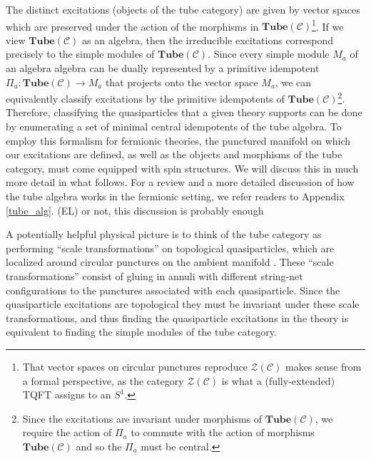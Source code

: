 \documentclass[12pt,a4paper]{article}
\newcounter{arrow}
\newcommand{\ra}{\rightarrow}
\newcommand{\mcz}{\mathcal{Z}}
\newcommand{\mcc}{\mathcal{C}}
\newcommand{\tube}{\textbf{Tube}}
\newcommand{\ethan}[1]{{\color{amethyst}\footnotesize{(EL) #1}}}
\begin{document}
The distinct excitations (objects of the tube category) are given by vector spaces which are preserved under the action of the morphisms in $\tube(\mcc)$\footnote{That vector spaces on circular punctures reproduce $\mcz(\mcc)$ makes sense from a formal perspective, as the category $\mcz(\mcc)$ is what a (fully-extended) TQFT assigns to an $S^1$.}. 
If we view $\tube(\mcc)$ as an algebra, then the irreducible excitations correspond precisely to the simple modules of $\tube(\mcc)$.
Since every simple module $M_a$ of an algebra algebra can be dually represented by a primitive idempotent $\Pi_a : \tube(\mcc) \ra M_a$ that projects onto the vector space $M_a$, we can equivalently classify excitations by the primitive idempotents of $\tube(\mcc)$\footnote{Since the excitations are invariant under morphisms of $\tube(\mcc)$, we require the action of $\Pi_a$ to commute with the action of morphisms $\tube(\mcc)$ and so the $\Pi_a$ must be central.}. 
Therefore, classifying the quasiparticles that a given theory supports can be done by enumerating a set of minimal central idempotents of the tube algebra. 
To employ this formalism for fermionic theories, the punctured manifold on which our excitations are defined, as well as the objects and morphisms of the tube category, must come equipped with spin structures. 
We will discuss this in much more detail in what follows. 
For a review and a more detailed discussion of how the tube algebra works in the fermionic setting, 
we refer readers to Appendix \ref{tube_alg}. \ethan{or not, this discussion is probably enough}

A potentially helpful physical picture is to think of the tube category as performing ``scale transformations'' 
on topological quasiparticles, which are localized around circular punctures on the ambient manifold \cite{Lan2014}. 
These ``scale transformations'' consist of gluing in annuli with different string-net configurations to the 
punctures associated with each quasiparticle. 
Since the quasiparticle excitations are topological they must be invariant under these scale transformations, 
and thus finding the quasiparticle excitations in the theory is equivalent to finding the simple 
modules of the tube category. 
 
 



 
\end{document}

